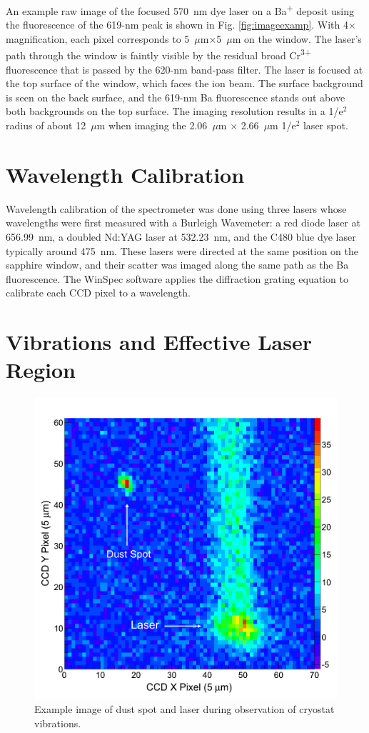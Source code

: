 An example raw image of the focused 570~nm dye laser on a Ba\textsuperscript{+} deposit using the fluorescence of the 619-nm peak is shown in Fig. \ref{fig:imageexamp}.  With 4$\times$ magnification, each pixel corresponds to 5~$\mu$m$\times$5~$\mu$m on the window.  The laser's path through the window is faintly visible by the residual broad Cr\textsuperscript{3+} fluorescence that is passed by the 620-nm band-pass filter.  The laser is focused at the top surface of the window, which faces the ion beam.  The surface background is seen on the back surface, and the 619-nm Ba fluorescence stands out above both backgrounds on the top surface.  The imaging resolution results in a 1/e$^{2}$ radius of about 12~$\mu$m when imaging the 2.06~$\mu$m $\times$ 2.66~$\mu$m 1/e$^{2}$ laser spot.

\section{Wavelength Calibration}

Wavelength calibration of the spectrometer was done using three lasers whose wavelengths were first measured with a Burleigh Wavemeter:  a red diode laser at 656.99~nm, a doubled Nd:YAG laser at 532.23~nm, and the C480 blue dye laser typically around 475~nm.  These lasers were directed at the same position on the sapphire window, and their scatter was imaged along the same path as the Ba fluorescence.  The WinSpec software applies the diffraction grating equation to calibrate each CCD pixel to a wavelength.

\section{Vibrations and Effective Laser Region}
\label{sec:vibes}

\begin{figure} %
        \centering
                \includegraphics[width=.6\textwidth]{figures/image_dustspot.png}
                \caption{Example image of dust spot and laser during observation of cryostat vibrations.}
\label{fig:dustspot}
\end{figure}

